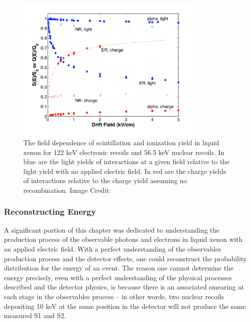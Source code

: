 \begin{figure}[t]
	\centering
	\includegraphics[width=0.85\textwidth]{field_dependence_nr_er}
	\caption{The field dependence of scintillation and ionization yield in liquid xenon for 122 keV electronic recoils and 56.5 keV nuclear recoils.  In blue are the light yields of interactions at a given field relative to the light yield with no applied electric field.  In red are the charge yields of interactions relative to the charge yield assuming no recombination.  Image Credit: }
	\label{fig:field_dependence_nr_er}
\end{figure}


\subsubsection{Reconstructing Energy}

A significant portion of this chapter was dedicated to understanding the production process of the observable photons and electrons in liquid xenon with an applied electric field.  With a perfect understanding of the observables production process and the detector effects, one could reconstruct the probability distribution for the energy of an event.  The reason one cannot determine the energy precisely, even with a perfect understanding of the physical processes described and the detector physics,  is because there is an associated smearing at each stage in the observables process -- in other words, two nuclear recoils depositing 10 keV at the same position in the detector will not produce the same measured S1 and S2.  

